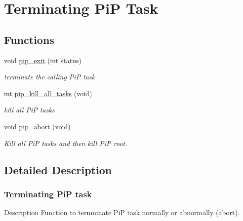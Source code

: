 \hypertarget{group__pip-2-exit}{\section{Terminating Pi\-P Task}
\label{group__pip-2-exit}
}
\subsection*{Functions}
\begin{DoxyCompactItemize}
\item 
void \hyperlink{group__pip-2-exit_ga55171ea8db2c2693f005560e427485c2}{pip\-\_\-exit} (int status)
\begin{DoxyCompactList}\small\item\em terminate the calling Pi\-P task \end{DoxyCompactList}\item 
int \hyperlink{group__pip-2-exit_gab7ba5cc62101240c68acf07905e36772}{pip\-\_\-kill\-\_\-all\-\_\-tasks} (void)
\begin{DoxyCompactList}\small\item\em kill all Pi\-P tasks \end{DoxyCompactList}\item 
void \hyperlink{group__pip-2-exit_ga49a4a9ee014ffdaf0c26df18adf965ad}{pip\-\_\-abort} (void)
\begin{DoxyCompactList}\small\item\em Kill all Pi\-P tasks and then kill Pi\-P root. \end{DoxyCompactList}\end{DoxyCompactItemize}


\subsection{Detailed Description}
\hypertarget{pip-exit}{}\subsubsection{Terminating Pi\-P task}\label{pip-exit}
\begin{DoxyParagraph}{Description}
Function to ternminate Pi\-P task normally or abnormally (abort). 
\end{DoxyParagraph}


